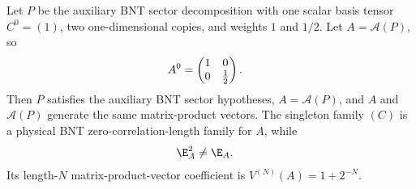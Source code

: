 \begin{lemma}%
    \label{thm:halved_weight_zcl_not_rfp}
    \leanok
    Let $P$ be the auxiliary BNT sector decomposition with one scalar basis
    tensor $C^0=(1)$, two one-dimensional copies, and weights $1$ and $1/2$.
    Let $A=\mathcal A(P)$, so
    \begin{align}
        A^0
         & =
        \begin{pmatrix}
            1 & 0        \\
            0 & \tfrac12
        \end{pmatrix}.
        \notag
    \end{align}
    Then $P$ satisfies the auxiliary BNT sector hypotheses,
    $A=\mathcal A(P)$, and $A$ and $\mathcal A(P)$ generate the same
    matrix-product vectors. The singleton family $(C)$ is a physical
    BNT zero-correlation-length family for $A$, while
    \begin{align}
        \E_A^2 & \neq\E_A.
        \notag
    \end{align}
    Its length-$N$ matrix-product-vector coefficient is
    $V^{(N)}(A)=1+2^{-N}$.
\end{lemma}
